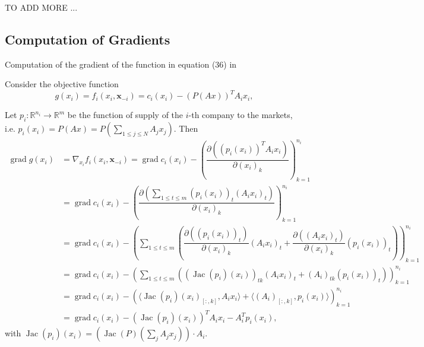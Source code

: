 TO ADD MORE ...

\subsection*{Computation of Gradients}

Computation of the gradient of the function in equation (36) in \citep{Yi_2019}

Consider the objective function
$$g(x_i) = f_i(x_i, \mathbf{x}_{-i}) = c_i(x_i) - (P(Ax))^T A_ix_i,$$

Let $p_i: \mathbb{R}^{n_i} \to \mathbb{R}^m$ be the function of supply of the $i$-th company to the markets, i.e. $p_i(x_i) = P(Ax) = P\left(\sum\limits_{1 \leqslant j \leqslant N} A_jx_j\right)$. Then
\begin{align*}
\operatorname{grad} g(x_i) & = \nabla_{x_i} f_i(x_i, \mathbf{x}_{-i}) = \operatorname{grad} c_i(x_i) - \left( \dfrac{\partial \left( (p_i(x_i))^T A_ix_i \right)}{\partial (x_i)_k} \right)_{k=1}^{n_i} \\
& = \operatorname{grad} c_i(x_i) - \left( \dfrac{\partial \left( \sum\limits_{1\leqslant t \leqslant m} (p_i(x_i))_t (A_ix_i)_t \right)}{\partial (x_i)_k} \right)_{k=1}^{n_i} \\
& = \operatorname{grad} c_i(x_i) - \left( \sum\limits_{1\leqslant t \leqslant m}\left( \dfrac{\partial \left( (p_i(x_i))_t \right)}{\partial (x_i)_k} (A_ix_i)_t + \dfrac{\partial \left( (A_ix_i)_t \right)}{\partial (x_i)_k} (p_i(x_i))_t \right) \right)_{k=1}^{n_i} \\
& = \operatorname{grad} c_i(x_i) - \left( \sum\limits_{1\leqslant t \leqslant m}\left( \left(\operatorname{Jac} (p_i)(x_i) \right)_{tk} (A_ix_i)_t + (A_i)_{tk} (p_i(x_i))_t \right) \right)_{k=1}^{n_i} \\
& = \operatorname{grad} c_i(x_i) - \left( \langle \operatorname{Jac}(p_i)(x_i)_{[:,k]}, A_ix_i \rangle + \langle (A_i)_{[:,k]}, p_i(x_i) \rangle \right)_{k=1}^{n_i} \\
& =\operatorname{grad} c_i(x_i) - \left( \operatorname{Jac}(p_i)(x_i) \right)^T A_ix_i - A_i^T p_i(x_i),
\end{align*}
with $\operatorname{Jac}(p_i)(x_i) = \left( \operatorname{Jac}(P)\left(\sum\limits_j A_jx_j\right) \right) \cdot A_i$.


